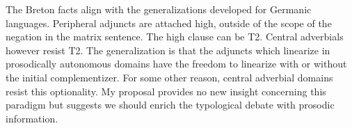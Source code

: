 \documentclass[output=paper,colorlinks,citecolor=brown]{langscibook}
\begin{document}
The Breton facts align with the generalizations developed for Germanic languages. Peripheral adjuncts are attached high, outside of the scope of the negation in the matrix sentence. The high clause can be T2. Central adverbials however resist T2. The generalization is that the adjuncts which linearize in prosodically autonomous domains have the freedom to linearize with or without the initial complementizer. For some other reason, central adverbial domains resist this optionality. My proposal provides no new insight concerning this paradigm but suggests we should enrich the typological debate with prosodic information.

\printbibliography[heading=subbibliography,notkeyword=this]
\end{document}
